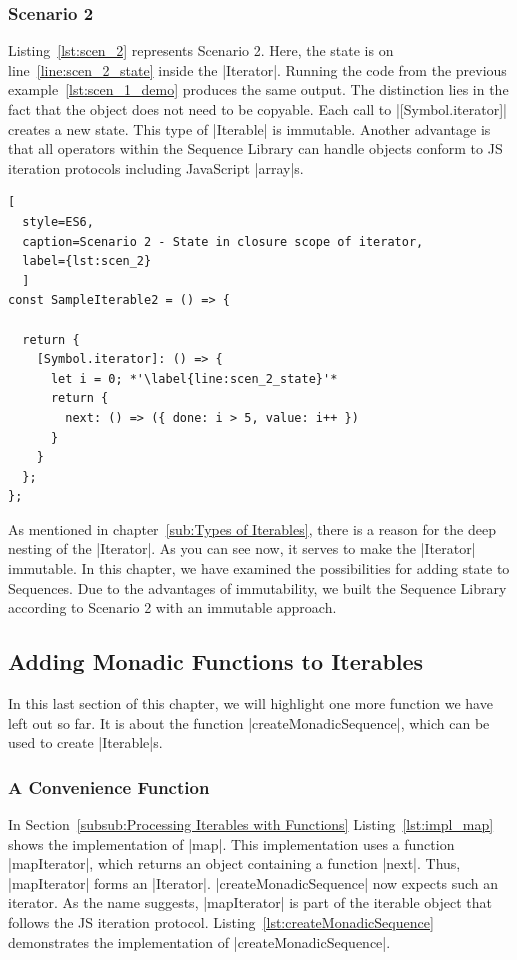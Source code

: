 \subsubsection{Scenario 2}
Listing~\ref{lst:scen_2} represents Scenario 2. Here, the state is on
line~\ref{line:scen_2_state} inside the |Iterator|. Running the code from the previous 
example~\ref{lst:scen_1_demo} produces the same output. The distinction lies in
the fact that the object does not need to be copyable. Each call to |[Symbol.iterator]| 
creates a new state. This type of |Iterable| is immutable. Another advantage is
that all operators within the Sequence Library can handle objects conform to JS
iteration protocols including JavaScript |array|s.

\begin{lstlisting}[
  style=ES6, 
  caption=Scenario 2 - State in closure scope of iterator,
  label={lst:scen_2}
  ]
const SampleIterable2 = () => {

  return {
    [Symbol.iterator]: () => {
      let i = 0; *'\label{line:scen_2_state}'*
      return {
        next: () => ({ done: i > 5, value: i++ })
      }
    }
  };
};
\end{lstlisting}

As mentioned in chapter~\ref{sub:Types of Iterables}, there is a reason for 
the deep nesting of the |Iterator|. As you can see now, it serves to make 
the |Iterator| immutable.
\newline
In this chapter, we have examined the possibilities for adding state to 
Sequences. Due to the advantages of immutability, we built the Sequence Library 
according to Scenario 2 with an immutable approach.


\subsection{Adding Monadic Functions to Iterables}
\label{sub:Adding Monadic Functions to Iterables}
In this last section of this chapter, we will highlight one more function we 
have left out so far. It is about the function |createMonadicSequence|, which
can be used to create |Iterable|s.

\subsubsection{A Convenience Function}
\label{subsub:A Convenience Function}
In Section~\ref{subsub:Processing Iterables with Functions}
Listing~\ref{lst:impl_map} shows the implementation of |map|. 
This implementation uses a function |mapIterator|, which returns an object
containing a function |next|. Thus, |mapIterator| forms an |Iterator|.
|createMonadicSequence| now expects such an iterator. As the name suggests, 
|mapIterator| is part of the 
iterable object that follows the JS iteration protocol.
Listing~\ref{lst:createMonadicSequence} demonstrates the implementation of 
|createMonadicSequence|.

